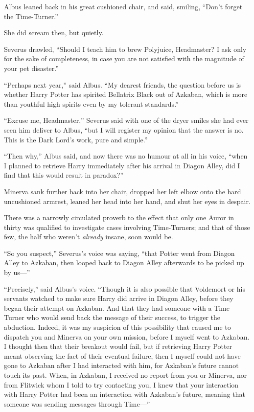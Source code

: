 Albus leaned back in his great cushioned chair, and said, smiling,
“Don’t forget the Time-Turner.”

She did scream then, but quietly.

Severus drawled,
“Should I teach him to brew Polyjuice, Headmaster? I ask only for the sake of completeness, in case you are not satisfied with the magnitude of your pet disaster.”

“Perhaps next year,” said Albus.
“My dearest friends, the question before us is whether Harry Potter has spirited Bellatrix Black out of Azkaban, which is more than youthful high spirits even by my tolerant standards.”

“Excuse me, Headmaster,” Severus said with one of the dryer smiles she had ever seen him deliver to Albus, “but I will register my opinion that the answer is no. This is the Dark Lord’s work, pure and simple.”

“Then why,” Albus said, and now there was no humour at all in his voice, “when I planned to retrieve Harry immediately after his arrival in Diagon Alley, did I find that this would result in paradox?”

Minerva sank further back into her chair, dropped her left elbow onto the hard uncushioned armrest, leaned her head into her hand, and shut her eyes in despair.

There was a narrowly circulated proverb to the effect that only one Auror in thirty was qualified to investigate cases involving Time-Turners; and that of those few, the half who weren’t \emph{already} insane, soon would be.

“So you suspect,” Severus’s voice was saying, “that Potter went from Diagon Alley to Azkaban, then looped back to Diagon Alley afterwards to be picked up by us—”

“Precisely,” said Albus’s voice.
“Though it is also possible that Voldemort or his servants watched to make sure Harry did arrive in Diagon Alley, before they began their attempt on Azkaban. And that they had someone with a Time-Turner who would send back the message of their success, to trigger the abduction. Indeed, it was my suspicion of this possibility that caused me to dispatch you and Minerva on your own mission, before I myself went to Azkaban. I thought then that their breakout would fail, but if retrieving Harry Potter meant observing the fact of their eventual failure, then I myself could not have gone to Azkaban after I had interacted with him, for Azkaban’s future cannot touch its past. When, in Azkaban, I received no report from you or Minerva, nor from Flitwick whom I told to try contacting you, I knew that your interaction with Harry Potter had been an interaction with Azkaban’s future, meaning that someone was sending messages through Time—”


